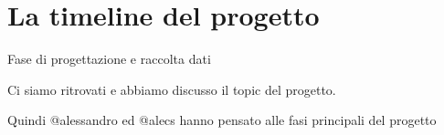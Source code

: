 \section{La timeline del progetto}

Fase di progettazione e raccolta dati

Ci siamo ritrovati e abbiamo discusso il topic del progetto.

Quindi @alessandro ed @alecs hanno pensato alle fasi principali del progetto 

